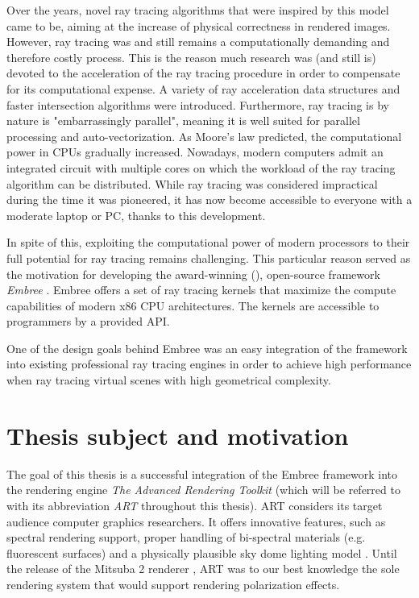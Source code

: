 Over the years, novel ray tracing algorithms that were inspired by this model came to be, aiming at the increase of physical correctness in rendered images. 
However, ray tracing was and still remains a computationally demanding and therefore costly process. This is the reason much research was (and still is) devoted to the acceleration of the ray tracing procedure in order to compensate for its computational expense. A variety of ray acceleration data structures and faster intersection algorithms were introduced.
Furthermore, ray tracing is by nature is "embarrassingly parallel", meaning it is well suited for parallel processing and auto-vectorization.
As Moore's law predicted, the computational power in CPUs gradually increased. Nowadays, modern computers admit an integrated circuit with multiple cores on which the workload of the ray tracing algorithm can be distributed. While ray tracing was considered impractical during the time it was pioneered, it has now become accessible to everyone with a moderate laptop or PC, thanks to this development.

In spite of this, exploiting the computational power of modern processors to their full potential for ray tracing remains challenging. This particular reason served as the motivation for developing the award-winning (\cite{embreeAward}), open-source framework \emph{Embree} \cite{wald2014embree}. Embree offers a set of ray tracing kernels that maximize the compute capabilities of modern x86 CPU architectures. The kernels are accessible to programmers by a provided API. 

One of the design goals behind Embree was an easy integration of the framework into existing professional ray tracing engines in order to achieve high performance when ray tracing virtual scenes with high geometrical complexity.

\section*{Thesis subject and motivation}
The goal of this thesis is a successful integration of the Embree framework into the rendering engine \emph{The Advanced Rendering Toolkit} \cite{artSoftware} (which will be referred to with its abbreviation \emph{ART} throughout this thesis). ART considers its target audience computer graphics researchers. It offers innovative features, such as spectral rendering support, proper handling of bi-spectral materials (e.g. fluorescent surfaces) \cite{mojzik2018handling} and a physically plausible sky dome lighting model \cite{wilkie2013predicting}. Until the release of the Mitsuba 2 renderer \cite{nimier2019mitsuba}, ART was to our best knowledge the sole rendering system that would support rendering polarization effects. 

